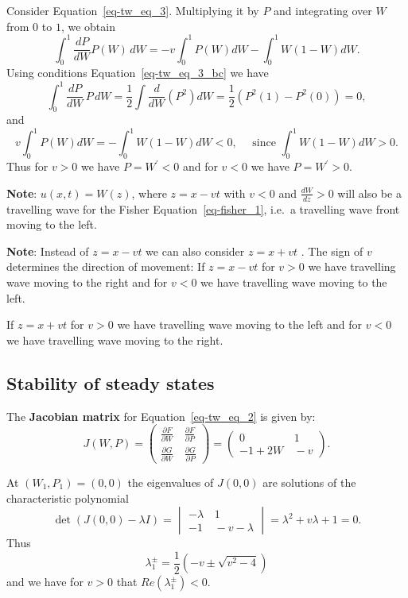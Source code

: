 \documentclass[
  letterpaper,
  DIV=11,
  numbers=noendperiod]{scrreprt}
\theoremstyle{definition}
\theoremstyle{plain}
\theoremstyle{plain}
\theoremstyle{remark}
\begin{document}
Consider Equation~\ref{eq-tw_eq_3}. Multiplying it by \(P\) and
integrating over \(W\) from \(0\) to \(1\), we obtain \[
\int_0^1 \frac{dP}{dW}  P(W)\, dW = - v \int_0^1  P(W) dW - \int_0^1 W(1-W) dW.
\] Using conditions Equation~\ref{eq-tw_eq_3_bc} we have \[
\int_0^1 \frac{dP}{dW} \, P\, dW = \frac 12 \int  \frac{d}{dW} (P^2) dW = \frac 12\left( P^2(1) - P^2(0)\right) = 0,
\] and \[
  v \int_0^1  P(W) dW=  - \int_0^1 W(1-W) dW <0, \quad \text{ since } \int_0^1 W(1-W) dW >0. 
\] Thus for \(v>0\) we have \(P= W^\prime<0\) and for \(v<0\) we have
\(P= W^\prime>0\).

\textbf{Note}: \(u(x,t) = W(z)\), where \(z= x- vt\) with \(v<0\) and
\(\frac{ dW}{dz} >0\) will also be a travelling wave for the Fisher
Equation~\ref{eq-fisher_1}, i.e.~a travelling wave front moving to the
left.

\textbf{Note}: Instead of \(z = x - vt\) we can also consider
\(z=x+ vt\) . The sign of \(v\) determines the direction of movement: If
\(z = x - vt\) \quad for \(v>0\) we have travelling wave moving to the
right and for \(v<0\) we have travelling wave moving to the left.

If \(z = x + vt\) \quad for \(v>0\) we have travelling wave moving to
the left and for \(v<0\) we have travelling wave moving to the right.

\hypertarget{stability-of-steady-states}{%
\subsection{Stability of steady
states}\label{stability-of-steady-states}}

The \textbf{Jacobian matrix} for Equation~\ref{eq-tw_eq_2} is given by:
\[
J(W,P) = \begin{pmatrix}
\frac{\partial F}{\partial W} & \, \frac{\partial F }{\partial P}\\
\frac{\partial G }{\partial W} & \, \frac{\partial G }{\partial P}
\end{pmatrix}  =
\begin{pmatrix}
0 & \,  1\\
-1 + 2W & \, - v 
\end{pmatrix}.
\]

At \((W_1, P_1)=(0,0)\) the eigenvalues of \(J(0,0)\) are solutions of
the characteristic polynomial \[
\det(J(0,0) - \lambda I) = \begin{vmatrix} -\lambda & \, 1\\
- 1 & \, -v - \lambda
\end{vmatrix} = \lambda^2 + v \lambda + 1 = 0.
\] Thus \[
\lambda^{\pm}_1 = \frac 12 ( - v \pm \sqrt{ v^2 - 4})
\] and we have for \(v>0\) that \({R} e(\lambda_1^\pm) <0\).
\end{document}
